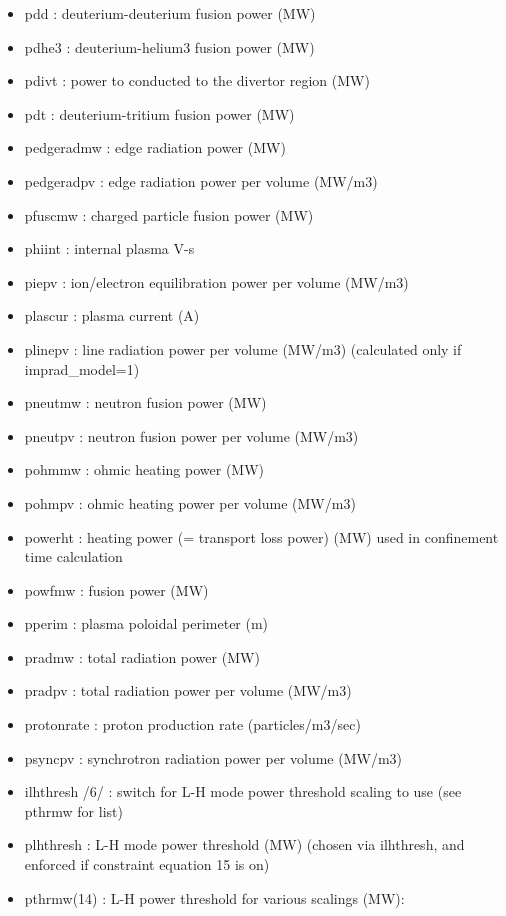 \documentclass[]{article}
\begin{document}
\begin{itemize}
\item
  pdd : deuterium-deuterium fusion power (MW)
\item
  pdhe3 : deuterium-helium3 fusion power (MW)
\item
  pdivt : power to conducted to the divertor region (MW)
\item
  pdt : deuterium-tritium fusion power (MW)
\item
  pedgeradmw : edge radiation power (MW)
\item
  pedgeradpv : edge radiation power per volume (MW/m3)
\item
  pfuscmw : charged particle fusion power (MW)
\item
  phiint : internal plasma V-s
\item
  piepv : ion/electron equilibration power per volume (MW/m3)
\item
  plascur : plasma current (A)
\item
  plinepv : line radiation power per volume (MW/m3) (calculated only if
  imprad\_model=1)
\item
  pneutmw : neutron fusion power (MW)
\item
  pneutpv : neutron fusion power per volume (MW/m3)
\item
  pohmmw : ohmic heating power (MW)
\item
  pohmpv : ohmic heating power per volume (MW/m3)
\item
  powerht : heating power (= transport loss power) (MW) used in
  confinement time calculation
\item
  powfmw : fusion power (MW)
\item
  pperim : plasma poloidal perimeter (m)
\item
  pradmw : total radiation power (MW)
\item
  pradpv : total radiation power per volume (MW/m3)
\item
  protonrate : proton production rate (particles/m3/sec)
\item
  psyncpv : synchrotron radiation power per volume (MW/m3)
\item
  ilhthresh /6/ : switch for L-H mode power threshold scaling to use
  (see pthrmw for list)
\item
  plhthresh : L-H mode power threshold (MW) (chosen via ilhthresh, and
  enforced if constraint equation 15 is on)
\item
  pthrmw(14) : L-H power threshold for various scalings (MW):


\end{itemize}
\end{document}
